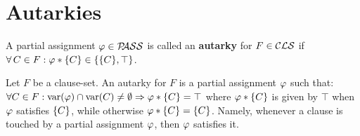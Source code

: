\documentclass[12pt]{book}
\begin{document}
\section{Autarkies}
\label{sec:Autarkies}

\begin{defi}\label{def:autarky1}
      A partial assignment $\varphi \in \mathcal{P\hspace{-0.32em}ASS}$ is called an \textbf{autarky} for $F \in \mathcal{CLS}$ if $\forall\, C \in F : \varphi * \{ C \} \in \{ \{ C \}, \top \}$.
\end{defi}

Let $F$ be a clause-set. An autarky for $F$ is a partial assignment $\varphi$ such that: $\forall C \in F : \operatorname{var}(\varphi) \cap \operatorname{var}(C) \neq \emptyset \Rightarrow \varphi * \{ C \} = \top$ where $\varphi * \{ C \}$ is given by $\top$ when $\varphi$ 
satisfies $\{ C \}$, while otherwise $\varphi * \{ C \} = \{ C \}$. 
Namely, whenever a clause is touched by a partial assignment $\varphi$, then $\varphi$ satisfies it.
\end{document}
